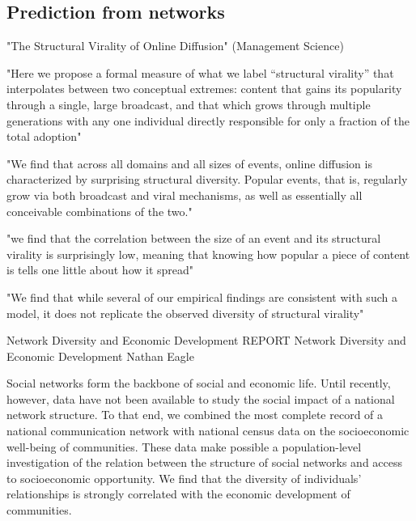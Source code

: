 \subsection{Prediction from networks}

"The Structural Virality of Online Diffusion" (Management Science)




"Here we propose a formal measure of what we label “structural virality” that interpolates between two conceptual extremes: content that gains its popularity through a single, large broadcast, and that which grows through multiple generations with any one individual directly responsible for only a fraction of the total adoption"

"We find that across all domains and all sizes of events, online diffusion is characterized by surprising structural diversity. Popular events, that is, regularly grow via both broadcast and viral mechanisms, as well as essentially all conceivable combinations of the two."

"we find that the correlation between the size of an event and its structural virality is surprisingly low, meaning that knowing how popular a piece of content is tells one little about how it spread"

"We find that while several of our empirical findings are consistent with such a model, it does not replicate the observed diversity of structural virality"











Network Diversity and Economic Development
REPORT
Network Diversity and Economic Development
Nathan Eagle

Social networks form the backbone of social and economic life. Until recently, however, data have not been available to study the social impact of a national network structure. To that end, we combined the most complete record of a national communication network with national census data on the socioeconomic well-being of communities. These data make possible a population-level investigation of the relation between the structure of social networks and access to socioeconomic opportunity. We find that the diversity of individuals’ relationships is strongly correlated with the economic development of communities.



